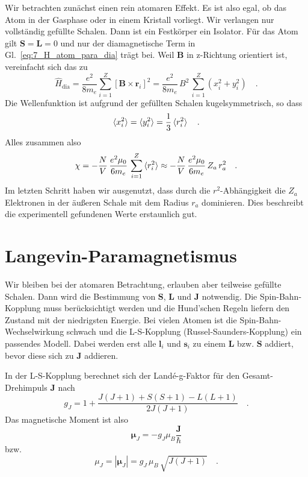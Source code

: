 Wir betrachten zunächst einen rein atomaren Effekt. Es ist also egal, ob das Atom in der Gasphase oder in einem Kristall vorliegt. Wir verlangen nur  vollständig gefüllte Schalen. Dann ist ein Festkörper ein Isolator. Für das Atom gilt $\bm{S} = \bm{L} = 0$ und nur der diamagnetische Term in Gl.~\ref{eq:7_H_atom_para_dia} trägt bei.  Weil $\bm{B}$ in z-Richtung orientiert ist, vereinfacht sich das zu
\begin{equation}
    \hat{H}_\text{dia} = 
    \frac{e^2}{8 m_e} 
     \sum_{i=1}^Z  \left[\bm{B} \times \bm{r}_i \right]^2
     = \frac{e^2}{8 m_e} \, B^2 \,
     \sum_{i=1}^Z 
     (x_i^2 + y_i^2) \quad .
\end{equation}
Die Wellenfunktion ist aufgrund der gefüllten Schalen kugelsymmetrisch, so dass
\begin{equation}
    \braket{x_i^2} =  \braket{y_i^2}   = \frac{1}{3} \braket{r_i^2} \quad .
\end{equation}
Alles zusammen also 
\begin{equation}
 \chi = - \frac{N}{V} \, \frac{e^2 \mu_0}{6 m_e} \,   \sum_{i=1}^Z   \braket{r_i^2}
 \approx  - \frac{N}{V} \, \frac{e^2 \mu_0}{6 m_e} \,   Z_a \,  r_a^2   \quad . 
 \label{eq:7_atom_diamag}
\end{equation}
Im letzten Schritt haben wir ausgenutzt, dass durch die $r^2$-Abhängigkeit die $Z_a$ Elektronen in der äußeren Schale mit dem Radius $r_a$ dominieren. Dies beschreibt die experimentell gefundenen Werte erstaunlich gut.






\section*{Langevin-Paramagnetismus}

Wir bleiben bei der atomaren Betrachtung, erlauben aber teilweise gefüllte Schalen. Dann wird die Bestimmung von $\bm{S}$, $\bm{L}$ und $\bm{J}$ notwendig. Die Spin-Bahn-Kopplung muss berücksichtigt werden und die Hund'schen Regeln liefern den  Zustand mit der niedrigsten Energie. Bei vielen Atomen ist die Spin-Bahn-Wechselwirkung schwach und  die L-S-Kopplung (Russel-Saunders-Kopplung) ein passendes Modell. Dabei werden  erst alle $\bm{l}_i$ und $\bm{s}_i$ zu einem $\bm{L}$ bzw. $\bm{S}$ addiert, bevor diese sich zu $\bm{J}$ addieren. 

In der L-S-Kopplung  berechnet sich der Landé-g-Faktor für den Gesamt-Drehimpuls $\bm{J}$ nach
\begin{equation}
    g_J = 1 + \frac{J (J+1) + S (S+1) - L (L+1)}{2 J (J+1)} \quad .
\end{equation}
Das magnetische Moment ist also
\begin{equation}
    \bm{\mu}_J = - g_J \mu_B  \frac{\bm J}{\hbar}
\end{equation}
bzw.
\begin{equation}
    \mu_J  = |\bm{\mu}_J | = g_J \, \mu_B  \, \sqrt{J (J+1)} \quad .
\end{equation}


